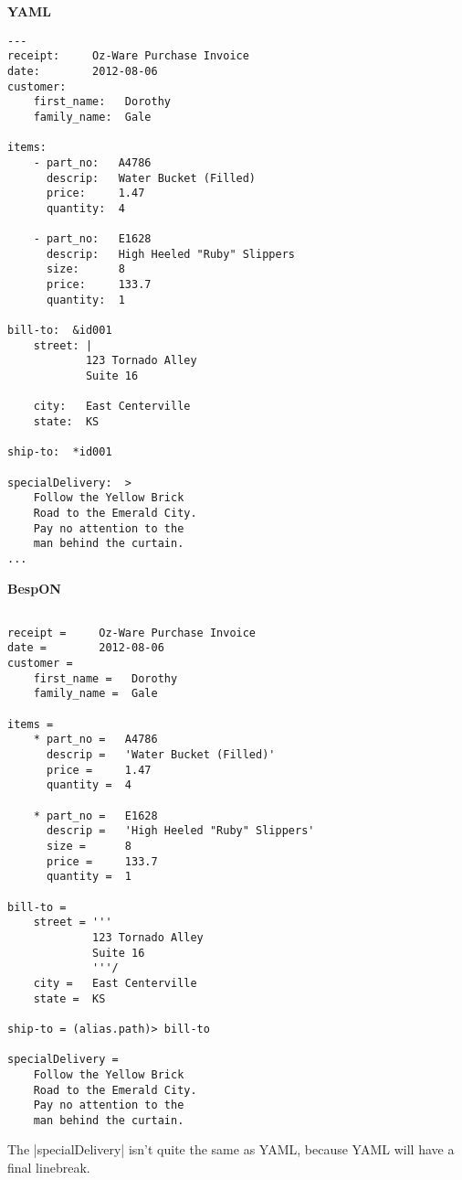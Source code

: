 \documentclass[11pt]{article}
\begin{document}
{{\begin{appendices}
\begin{tcolorbox}{}
\begin{multicols}{2}
\centering \textbf{YAML}
\begin{Verbatim}[formatcom=\color{DarkGreen}]
---
receipt:     Oz-Ware Purchase Invoice
date:        2012-08-06
customer:
    first_name:   Dorothy
    family_name:  Gale

items:
    - part_no:   A4786
      descrip:   Water Bucket (Filled)
      price:     1.47
      quantity:  4

    - part_no:   E1628
      descrip:   High Heeled "Ruby" Slippers
      size:      8
      price:     133.7
      quantity:  1

bill-to:  &id001
    street: |
            123 Tornado Alley
            Suite 16

    city:   East Centerville
    state:  KS

ship-to:  *id001

specialDelivery:  >
    Follow the Yellow Brick
    Road to the Emerald City.
    Pay no attention to the
    man behind the curtain.
...
\end{Verbatim}
\columnbreak
\centering \textbf{BespON}

\begin{Verbatim}

receipt =     Oz-Ware Purchase Invoice
date =        2012-08-06
customer =
    first_name =   Dorothy
    family_name =  Gale

items =
    * part_no =   A4786
      descrip =   'Water Bucket (Filled)'
      price =     1.47
      quantity =  4

    * part_no =   E1628
      descrip =   'High Heeled "Ruby" Slippers'
      size =      8
      price =     133.7
      quantity =  1

bill-to = 
    street = '''
             123 Tornado Alley
             Suite 16
             '''/
    city =   East Centerville
    state =  KS

ship-to = (alias.path)> bill-to

specialDelivery = 
    Follow the Yellow Brick
    Road to the Emerald City.
    Pay no attention to the
    man behind the curtain.

\end{Verbatim}
\end{multicols}
\end{tcolorbox}
The |specialDelivery| isn't quite the same as YAML, because YAML will have a final linebreak.



\begin{tcolorbox}{}
\begin{multicols}{2}


\end{multicols}
\end{tcolorbox}
\end{appendices}}}
\end{document}
